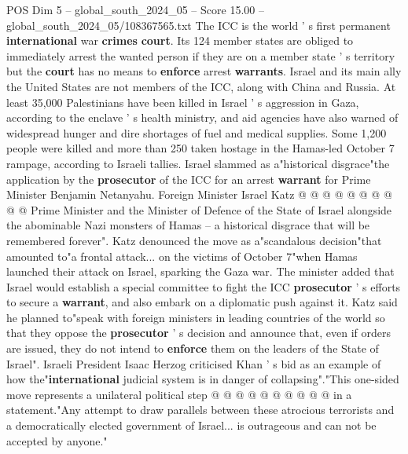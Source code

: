 \begin{textsample}{POS Dim 5 – global\_south\_2024\_05 – Score 15.00 – global\_south\_2024\_05/108367565.txt}
The ICC is the world ' s first permanent \textbf{international} war \textbf{crimes} \textbf{court}.
Its 124 member states are obliged to immediately arrest the wanted person if they are on a member state ' s territory but the \textbf{court} has no means to \textbf{enforce} arrest \textbf{warrants}.
Israel and its main ally the United States are not members of the ICC, along with China and Russia.
At least 35,000 Palestinians have been killed in Israel ' s aggression in Gaza, according to the enclave ' s health ministry, and aid agencies have also warned of widespread hunger and dire shortages of fuel and medical supplies.
Some 1,200 people were killed and more than 250 taken hostage in the Hamas-led October 7 rampage, according to Israeli tallies.
Israel slammed as a"historical disgrace"the application by the \textbf{prosecutor} of the ICC for an arrest \textbf{warrant} for Prime Minister Benjamin Netanyahu.
Foreign Minister Israel Katz @ @ @ @ @ @ @ @ @ @ Prime Minister and the Minister of Defence of the State of Israel alongside the abominable Nazi monsters of Hamas -- a historical disgrace that will be remembered forever".
Katz denounced the move as a"scandalous decision"that amounted to"a frontal attack... on the victims of October 7"when Hamas launched their attack on Israel, sparking the Gaza war.
The minister added that Israel would establish a special committee to fight the ICC \textbf{prosecutor} ' s efforts to secure a \textbf{warrant}, and also embark on a diplomatic push against it.
Katz said he planned to"speak with foreign ministers in leading countries of the world so that they oppose the \textbf{prosecutor} ' s decision and announce that, even if orders are issued, they do not intend to \textbf{enforce} them on the leaders of the State of Israel".
Israeli President Isaac Herzog criticised Khan ' s bid as an example of how the"\textbf{international} judicial system is in danger of collapsing"."This one-sided move represents a unilateral political step @ @ @ @ @ @ @ @ @ @ in a statement."Any attempt to draw parallels between these atrocious terrorists and a democratically elected government of Israel... is outrageous and can not be accepted by anyone."

\end{textsample}

